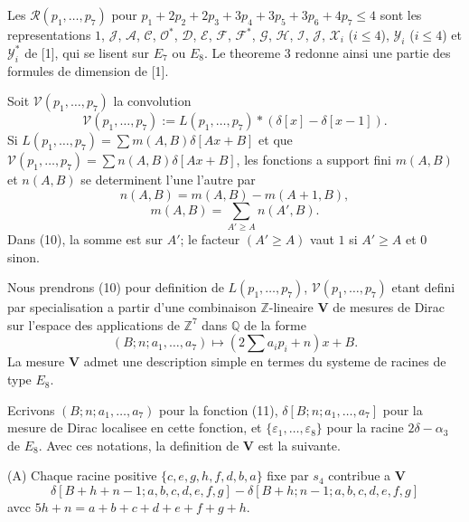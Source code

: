 \documentclass[11pt,a4paper]{article}
\theoremstyle{plain}
\theoremstyle{definition}
\begin{document}
Les $\mathcal{R}(p_1,\dots,p_7)$ pour $p_1 + 2p_2 + 2p_3 + 3p_4 + 3p_5 + 3p_6 + 4p_7 \leq 4$ sont les representations $1$, $\mathcal{J}$, $\mathcal{A}$, $\mathcal{C}$, $\mathcal{O}^*$, $\mathcal{D}$, $\mathcal{E}$, $\mathcal{F}$, $\mathcal{F}^*$, $\mathcal{G}$, $\mathcal{H}$, $\mathcal{I}$, $\mathcal{J}$, $\mathcal{X}_i$ ($i \leq 4$), $\mathcal{Y}_i$ ($i \leq 4$) et $\mathcal{Y}_i^*$ de [1], qui se lisent sur $E_7$ ou $E_8$. Le theoreme 3 redonne ainsi une partie des formules de dimension de [1].

\smallskip

Soit $\mathcal{V}(p_1,\dots,p_7)$ la convolution
\begin{equation}\label{eq:8}
\mathcal{V}(p_1,\dots,p_7) := L(p_1,\dots,p_7) * (\delta[x] - \delta[x-1]).
\end{equation}
Si $L(p_1,\dots,p_7) = \sum m(A,B)\delta[Ax + B]$ et que $\mathcal{V}(p_1,\dots,p_7) = \sum n(A,B)\delta[Ax + B]$, les fonctions a support fini $m(A,B)$ et $n(A,B)$ se determinent l'une l'autre par
\begin{equation}\label{eq:9}
n(A,B) = m(A,B) - m(A+1,B),
\end{equation}
\begin{equation}\label{eq:10}
m(A,B) = \sum_{A' \geq A} n(A',B).
\end{equation}
Dans (10), la somme est sur $A'$; le facteur $(A' \geq A)$ vaut $1$ si $A' \geq A$ et $0$ sinon.

Nous prendrons (10) pour definition de $L(p_1,\dots,p_7)$, $\mathcal{V}(p_1,\dots,p_7)$ etant defini par specialisation a partir d'une combinaison $\mathbb{Z}$-lineaire $\mathbf{V}$ de mesures de Dirac sur l'espace des applications de $\mathbb{Z}^7$ dans $\mathbb{Q}$ de la forme
\begin{equation}\label{eq:11}
(B; n; a_1,\dots,a_7) \mapsto (2\textstyle\sum a_i p_i + n)x + B.
\end{equation}
La mesure $\mathbf{V}$ admet une description simple en termes du systeme de racines de type $E_8$.

Ecrivons $(B; n; a_1,\dots,a_7)$ pour la fonction (11), $\delta[B; n; a_1,\dots,a_7]$ pour la mesure de Dirac localisee en cette fonction, et $\{\varepsilon_1,\dots,\varepsilon_8\}$ pour la racine $2\delta - \alpha_3$ de $E_8$. Avec ces notations, la definition de $\mathbf{V}$ est la suivante.

\smallskip

(A) Chaque racine positive $\{c, e, g, h, f, d, b, a\}$ fixe par $s_4$ contribue a $\mathbf{V}$
\[
\delta[B+h+n-1; a,b,c,d,e,f,g] - \delta[B+h; n-1; a,b,c,d,e,f,g]
\]
avcc $5h + n = a + b + c + d + e + f + g + h$.
\end{document}

